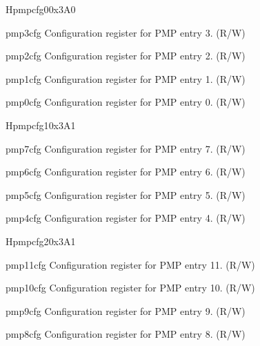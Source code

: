 \begin{register}{H}{pmpcfg0}{0x3A0}
\label{regdesc:pmpcfg0}%
%
%
%
%
\regnewline%
\begin{regdesc}
\begin{reglist}
\label{fielddesc:pmp3cfg}\item [pmp3cfg] Configuration register for PMP entry 3. (R/W)
\label{fielddesc:pmp2cfg}\item [pmp2cfg] Configuration register for PMP entry 2. (R/W)
\label{fielddesc:pmp1cfg}\item [pmp1cfg] Configuration register for PMP entry 1. (R/W)
\label{fielddesc:pmp0cfg}\item [pmp0cfg] Configuration register for PMP entry 0. (R/W)
\end{reglist}
\end{regdesc}
\end{register}

\begin{register}{H}{pmpcfg1}{0x3A1}
\label{regdesc:pmpcfg1}%
%
%
%
%
\regnewline%
\begin{regdesc}
\begin{reglist}
\label{fielddesc:pmp7cfg}\item [pmp7cfg] Configuration register for PMP entry 7. (R/W)
\label{fielddesc:pmp6cfg}\item [pmp6cfg] Configuration register for PMP entry 6. (R/W)
\label{fielddesc:pmp5cfg}\item [pmp5cfg] Configuration register for PMP entry 5. (R/W)
\label{fielddesc:pmp4cfg}\item [pmp4cfg] Configuration register for PMP entry 4. (R/W)
\end{reglist}
\end{regdesc}
\end{register}

\begin{register}{H}{pmpcfg2}{0x3A1}
\label{regdesc:pmpcfg2}%
%
%
%
%
\regnewline%
\begin{regdesc}
\begin{reglist}
\label{fielddesc:pmp11cfg}\item [pmp11cfg] Configuration register for PMP entry 11. (R/W)
\label{fielddesc:pmp10cfg}\item [pmp10cfg] Configuration register for PMP entry 10. (R/W)
\label{fielddesc:pmp9cfg}\item [pmp9cfg] Configuration register for PMP entry 9. (R/W)
\label{fielddesc:pmp8cfg}\item [pmp8cfg] Configuration register for PMP entry 8. (R/W)
\end{reglist}
\end{regdesc}
\end{register}

